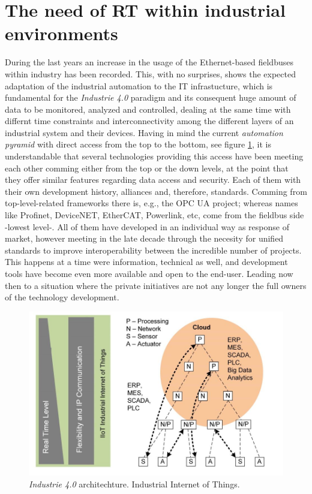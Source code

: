 \section{The need of RT within industrial environments}

During the last years an increase in the usage of the Ethernet-based fieldbuses within industry has been recorded. This, with no surprises,
shows the expected adaptation of the industrial automation to the IT infrastucture, which is fundamental for the \emph{Industrie 4.0} paradigm
and its consequent huge amount of data to be monitored, analyzed and controlled, dealing at the same time with differnt time constraints and
interconnectivity among the different layers of an industrial system and their devices. 
Having in mind the current \emph{automation pyramid} with direct access from the top to the bottom\cite{tsn_intro}, see figure \ref{fig:pyramid-iiot}, 
it is understandable that several technologies providing this access have been meeting each other comming either from the top or the down levels, 
at the point that they offer similar features regarding data access and security. Each of them with their own development history,
alliances and, therefore, standards. Comming from top-level-related frameworks there is, e.g., the OPC UA project; whereas names like Profinet,
DeviceNET, EtherCAT, Powerlink, etc, come from the fieldbus side -lowest level-. All of them have developed in an individual way as response
of market, however meeting in the late decade through the necesity for unified standards to improve interoperability between the incredible number
of projects. This happens at a time were information, technical as well, and development tools have become even more available and
open to the end-user. Leading now then to a situation where the private initiatives are not any longer the full owners of the technology development.

\begin{figure}[b]
    \centering
    \includegraphics[width=.5\textwidth]{imgs/intro-industryarchitecture.jpg}
    \caption{\emph{Industrie 4.0} architechture. Industrial Internet of Things.\cite{tsn_intro}}
    \label{fig:pyramid-iiot}
\end{figure}

